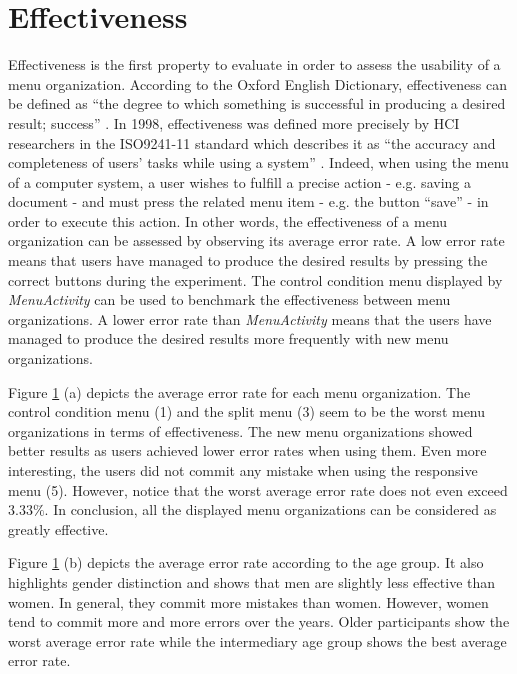 \section{Effectiveness}
Effectiveness is the first property to evaluate in order to assess the 
usability of a menu organization. According to the Oxford English Dictionary, 
effectiveness can be defined as \enquote{the degree to which something is 
successful in producing a desired result; success} \cite{effectiveness}. In 
1998, effectiveness was defined more precisely by HCI researchers in 
the ISO9241-11 standard which describes it as \enquote{the accuracy and 
completeness of users' 
tasks while using a system} \cite{iso}. Indeed, when using the 
menu of a computer system, a user wishes to fulfill a precise action - e.g. 
saving a document - and must press the related menu item - e.g. the button 
\enquote{save} - in order 
to execute this action. In other words, the effectiveness of a menu 
organization can be assessed by observing its average error rate. A low error 
rate means that users have managed to produce the desired results by pressing 
the correct buttons during the experiment. The control condition menu 
displayed 
by \textit{MenuActivity} can be used to benchmark the effectiveness between 
menu organizations. A lower error rate than \textit{MenuActivity} means that 
the users have managed to produce the desired results more frequently with new 
menu 
organizations.\newline

Figure \ref{fig:errors} (a) depicts the average error rate for each 
menu organization. The control condition menu (1) and the split menu (3) seem 
to be the worst menu organizations in terms of effectiveness. The new menu 
organizations showed better results as users achieved lower error rates when 
using them. Even more interesting, the users did not commit any mistake when 
using the responsive menu (5). However, notice that the worst 
average error rate does not even exceed $3.33\%$. In conclusion, all 
the displayed menu organizations can be considered as greatly effective.

\begin{figure}[!ht]
    
    \label{fig:errors}
\end{figure}

Figure \ref{fig:errors} (b) depicts the average error rate according to 
the age group. It also highlights gender distinction and shows that men are 
slightly less effective than women. In general, they commit more mistakes than 
women. However, women tend to commit more and more errors over the years. Older 
participants show the worst average error rate while the intermediary age group 
shows the best average error rate.

